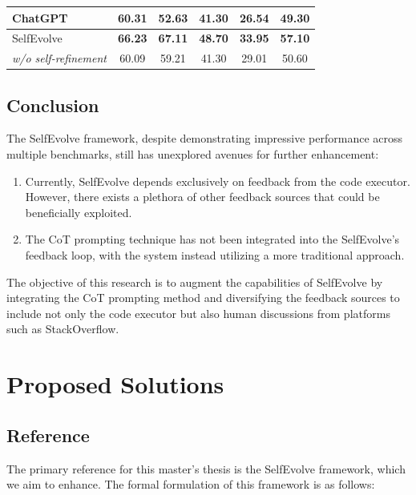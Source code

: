 \documentclass[a4paper,oneside]{book}
\begin{document}
\begin{table}[H]
\begin{center}
\begin{tabular}{|lccccc|}
            \multicolumn{1}{|l|}{ChatGPT}                          & \multicolumn{1}{c|}{60.31}                 & \multicolumn{1}{c|}{52.63}          & \multicolumn{1}{c|}{41.30}          & \multicolumn{1}{c|}{26.54}          & 49.30          \\ \hline
            \multicolumn{1}{|l|}{SelfEvolve}                       & \multicolumn{1}{c|}{\textbf{66.23}}        & \multicolumn{1}{c|}{\textbf{67.11}} & \multicolumn{1}{c|}{\textbf{48.70}} & \multicolumn{1}{c|}{\textbf{33.95}} & \textbf{57.10} \\ \hline
            \multicolumn{1}{|r|}{\textit{w/o self-refinement}}     & \multicolumn{1}{c|}{60.09}                 & \multicolumn{1}{c|}{59.21}          & \multicolumn{1}{c|}{41.30}          & \multicolumn{1}{c|}{29.01}          & 50.60          \\ \hline
        \end{tabular}
    \end{center}
\end{table}

\section{Conclusion}
The SelfEvolve framework, despite demonstrating impressive performance across multiple benchmarks, still has unexplored avenues for further enhancement:

\begin{enumerate}
    \item Currently, SelfEvolve depends exclusively on feedback from the code executor. However, there exists a plethora of other feedback sources that could be beneficially exploited.

    \item The CoT prompting technique has not been integrated into the SelfEvolve's feedback loop, with the system instead utilizing a more traditional approach.
\end{enumerate}

The objective of this research is to augment the capabilities of SelfEvolve by integrating the CoT prompting method and diversifying the feedback sources to include not only the code executor but also human discussions from platforms such as StackOverflow.

\chapter{Proposed Solutions}
\section{Reference}
The primary reference for this master's thesis is the SelfEvolve framework, which we aim to enhance. The formal formulation of this framework is as follows:
\end{document}
